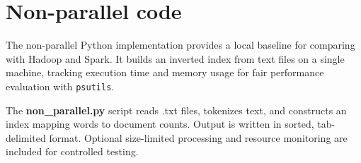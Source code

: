 \section{Non-parallel code}
The non-parallel Python implementation provides a local baseline for comparing with Hadoop and Spark. It builds an inverted index from text files on a single machine, tracking execution time and memory usage for fair performance evaluation with \texttt{psutils}.

The \textbf{non\_parallel.py} script reads .txt files, tokenizes text, and constructs an index mapping words to document counts. Output is written in sorted, tab-delimited format. Optional size-limited processing and resource monitoring are included for controlled testing. 

